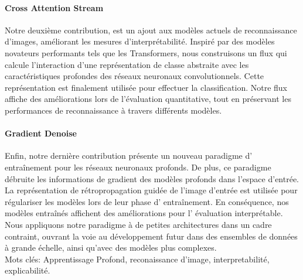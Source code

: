 \paragraph{Cross Attention Stream} Notre deuxième contribution, est un ajout aux modèles actuels de 
reconnaissance d'images, améliorant les mesures d'interprétabilité. Inspiré par des modèles 
novateurs performants tels que les Transformers, nous construisons un flux qui calcule l'interaction 
d'une représentation de classe abstraite avec les caractéristiques profondes des réseaux neuronaux 
convolutionnels. Cette représentation est finalement utilisée pour effectuer la classification. 
Notre flux affiche des améliorations lors de l'évaluation quantitative, tout en préservant les 
performances de reconnaissance à travers différents modèles.\\

\paragraph{Gradient Denoise} Enfin, notre dernière contribution présente un nouveau paradigme d' 
entraînement pour les réseaux neuronaux profonds. De plus, ce paradigme débruite les informations 
de gradient des modèles profonds dans l'espace d'entrée. La représentation de rétropropagation 
guidée de l'image d'entrée est utilisée pour régulariser les modèles lors de leur phase d' 
entraînement. En conséquence, nos modèles entraînés affichent des améliorations pour l' 
évaluation interprétable. Nous appliquons notre paradigme à de petites architectures dans un cadre 
contraint, ouvrant la voie au développement futur dans des ensembles de données à grande échelle, 
ainsi qu'avec des modèles plus complexes.\\

\vspace{0.5cm}
Mots clés: Apprentissage Profond, reconaissance d'image, interpretabilité, explicabilité.
